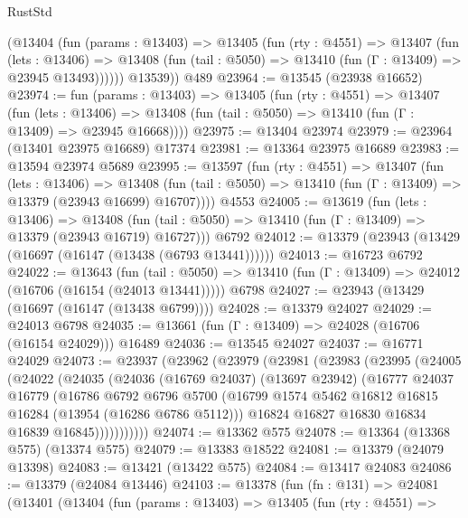 \begin{lexlean}{RustStd}
\begin{coremodule}
        (@13404
          (fun (params : @13403) =>
          @13405
            (fun (rty : @4551) =>
            @13407
              (fun (lets : @13406) =>
              @13408 (fun (tail : @5050) => @13410 (fun (Γ : @13409) => @23945 @13493))))))
        @13539))
    @489
@23964 := @13545 (@23938 @16652)
@23974 := fun (params : @13403) =>
  @13405
    (fun (rty : @4551) =>
    @13407
      (fun (lets : @13406) =>
      @13408 (fun (tail : @5050) => @13410 (fun (Γ : @13409) => @23945 @16668))))
@23975 := @13404 @23974
@23979 := @23964 (@13401 @23975 @16689) @17374
@23981 := @13364 @23975 @16689
@23983 := @13594 @23974 @5689
@23995 := @13597
    (fun (rty : @4551) =>
    @13407
      (fun (lets : @13406) =>
      @13408 (fun (tail : @5050) => @13410 (fun (Γ : @13409) => @13379 (@23943 @16699) @16707))))
    @4553
@24005 := @13619
    (fun (lets : @13406) =>
    @13408 (fun (tail : @5050) => @13410 (fun (Γ : @13409) => @13379 (@23943 @16719) @16727)))
    @6792
@24012 := @13379 (@23943 (@13429 (@16697 (@16147 (@13438 (@6793 @13441))))))
@24013 := @16723 @6792
@24022 := @13643
    (fun (tail : @5050) => @13410 (fun (Γ : @13409) => @24012 (@16706 (@16154 (@24013 @13441)))))
    @6798
@24027 := @23943 (@13429 (@16697 (@16147 (@13438 @6799))))
@24028 := @13379 @24027
@24029 := @24013 @6798
@24035 := @13661 (fun (Γ : @13409) => @24028 (@16706 (@16154 @24029))) @16489
@24036 := @13545 @24027
@24037 := @16771 @24029
@24073 := @23937
    (@23962
      (@23979
        (@23981
          (@23983
            (@23995
              (@24005
                (@24022
                  (@24035
                    (@24036
                      (@16769 @24037)
                      (@13697 @23942)
                      (@16777
                        @24037
                        @16779
                        (@16786
                          @6792
                          @6796
                          @5700
                          (@16799 @1574 @5462 @16812 @16815 @16284 (@13954 (@16286 @6786 @5112)))
                          @16824
                          @16827
                          @16830
                          @16834
                          @16839
                          @16845)))))))))))
@24074 := @13362 @575
@24078 := @13364 (@13368 @575) (@13374 @575)
@24079 := @13383 @18522
@24081 := @13379 (@24079 @13398)
@24083 := @13421 (@13422 @575)
@24084 := @13417 @24083
@24086 := @13379 (@24084 @13446)
@24103 := @13378
    (fun (fn : @131) =>
    @24081
      (@13401
        (@13404
          (fun (params : @13403) =>
          @13405
            (fun (rty : @4551) =>

\end{coremodule}
\end{lexlean}
